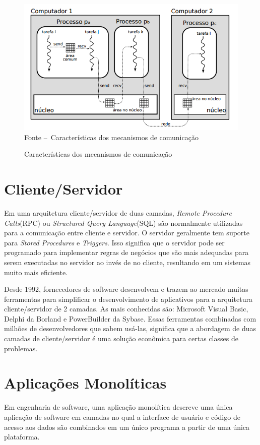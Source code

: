 \newpage
\begin{figure}[ht]
\centering
\caption{Características dos mecanismos de comunicação}
\includegraphics[width=1\textwidth]{figuras/ipc.png}
\label{fig:figura1}
Fonte --\ Características dos mecanismos de comunicação 
\end{figure}

\section{Cliente/Servidor}\label{sec:clientserver}

Em uma arquitetura cliente/servidor de duas camadas, \textit{Remote Procedure Calls}(RPC) ou \textit{Structured Query Language}(SQL) são normalmente utilizadas para a comunicação entre cliente e servidor. O servidor geralmente tem suporte para \textit{Stored Procedures} e \textit{Triggers}. Isso significa que o servidor pode ser programado para implementar regras de negócios que são mais adequadas para serem executadas no servidor ao invés de no cliente, resultando em um sistemas muito mais eficiente. \cite{client-server-future}

Desde 1992, fornecedores de software desenvolvem e trazem ao mercado muitas ferramentas para simplificar o desenvolvimento de aplicativos para a arquitetura cliente/servidor de 2 camadas. As mais conhecidas são: Microsoft Visual Basic, Delphi da Borland e PowerBuilder da Sybase. Essas ferramentas combinadas com milhões de desenvolvedores que sabem usá-las, significa que a abordagem de duas camadas de cliente/servidor é uma solução econômica para certas classes de problemas.


\section{Aplicações Monolíticas}\label{sec:monolitico}
Em engenharia de software, uma aplicação monolítica descreve uma única aplicação de software em camadas no qual a interface de usuário e código de acesso aos dados são combinados em um único programa a partir de uma única plataforma.

